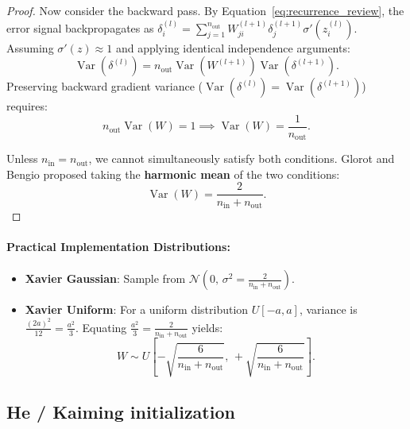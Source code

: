 \begin{proof}
Now consider the backward pass. By Equation~\eqref{eq:recurrence_review}, the error signal backpropagates as $\delta_i^{(l)} = \sum_{j=1}^{n_{\text{out}}} W_{ji}^{(l+1)} \delta_j^{(l+1)} \sigma'(z_i^{(l)})$. Assuming $\sigma'(z) \approx 1$ and applying identical independence arguments:
\begin{equation}
\operatorname{Var}(\delta^{(l)}) = n_{\text{out}} \operatorname{Var}(W^{(l+1)}) \operatorname{Var}(\delta^{(l+1)}).
\label{eq:backward_variance_recurrence}
\end{equation}
Preserving backward gradient variance ($\operatorname{Var}(\delta^{(l)}) = \operatorname{Var}(\delta^{(l+1)})$) requires:
\begin{equation}
n_{\text{out}} \operatorname{Var}(W) = 1 \implies \operatorname{Var}(W) = \frac{1}{n_{\text{out}}}.
\label{eq:fan_out_condition}
\end{equation}

Unless $n_{\text{in}} = n_{\text{out}}$, we cannot simultaneously satisfy both conditions. Glorot and Bengio proposed taking the \textbf{harmonic mean} of the two conditions:
\begin{equation}
\operatorname{Var}(W) = \frac{2}{n_{\text{in}} + n_{\text{out}}}.
\end{equation}
\end{proof}

\paragraph{Practical Implementation Distributions:}
\begin{itemize}[noitemsep,topsep=2pt,parsep=0pt,partopsep=0pt]
  \item \textbf{Xavier Gaussian}: Sample from $\mathcal{N}\left(0, \, \sigma^2 = \frac{2}{n_{\text{in}} + n_{\text{out}}}\right)$.
  \item \textbf{Xavier Uniform}: For a uniform distribution $U[-a, a]$, variance is $\frac{(2a)^2}{12} = \frac{a^2}{3}$. Equating $\frac{a^2}{3} = \frac{2}{n_{\text{in}} + n_{\text{out}}}$ yields:
    \begin{equation}
    W \sim U\left[ -\sqrt{\frac{6}{n_{\text{in}} + n_{\text{out}}}}, \, +\sqrt{\frac{6}{n_{\text{in}} + n_{\text{out}}}} \right].
    \label{eq:xavier_uniform}
    \end{equation}
\end{itemize}

\subsection{He / Kaiming initialization}
\label{sec:he_kaiming_initialization}

